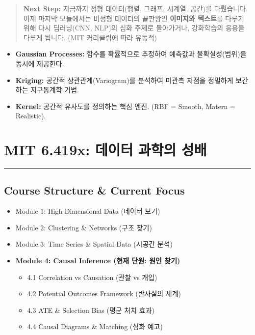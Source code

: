 \documentclass[11pt,a4paper]{book}
\theoremstyle{definition}
\begin{document}
\vspace{1cm}
\begin{quote}
\textbf{Next Step:} 지금까지 정형 데이터(행렬, 그래프, 시계열, 공간)를 다뤘습니다. 이제 마지막 모듈에서는 비정형 데이터의 끝판왕인 \textbf{이미지와 텍스트}를 다루기 위해 다시 딥러닝(CNN, NLP)의 심화 주제로 돌아가거나, 강화학습의 응용을 다루게 됩니다. (MIT 커리큘럼에 따라 유동적)
\end{quote}

\begin{summarybox}[title={Module 3 (Part B) 핵심 요약}]
\begin{itemize}
    \item \textbf{Gaussian Processes:} 함수를 확률적으로 추정하여 예측값과 불확실성(범위)을 동시에 제공한다.
    \item \textbf{Kriging:} 공간적 상관관계(Variogram)를 분석하여 미관측 지점을 정밀하게 보간하는 지구통계학 기법.
    \item \textbf{Kernel:} 공간적 유사도를 정의하는 핵심 엔진. (RBF = Smooth, Matern = Realistic).
\end{itemize}
\end{summarybox}


\chapter{MIT 6.419x: 데이터 과학의 성배}
\label{ch:lecture9}


\vspace{1cm}
\hrule
\vspace{1cm}

\section*{Course Structure \& Current Focus}
\begin{itemize}
    \item Module 1: High-Dimensional Data (데이터 보기)
    \item Module 2: Clustering \& Networks (구조 찾기)
    \item Module 3: Time Series \& Spatial Data (시공간 분석)
    \item \textbf{\textcolor{mainblue}{Module 4: Causal Inference (현재 단원: 원인 찾기)}}
    \begin{itemize}
        \item 4.1 Correlation vs Causation (관찰 vs 개입)
        \item 4.2 Potential Outcomes Framework (반사실의 세계)
        \item 4.3 ATE \& Selection Bias (평균 처치 효과)
        \item 4.4 Causal Diagrams \& Matching (심화 예고)
    \end{itemize}
\end{itemize}
\end{document}

